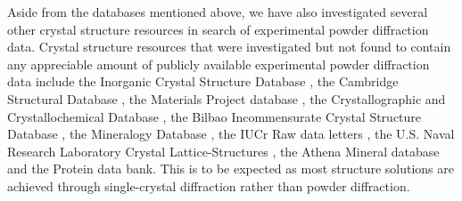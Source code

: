 Aside from the databases mentioned above, we have also investigated several other crystal structure resources in search of experimental powder diffraction data. Crystal structure resources that were investigated but not found to contain any appreciable amount of publicly available experimental powder diffraction data include the Inorganic Crystal Structure Database \cite{ICSDWeb}, the Cambridge Structural Database \cite{CambridgeWeb}, the Materials Project database \cite{MatProjWeb}, the Crystallographic and Crystallochemical Database \cite{CrystallochemicalWeb}, the Bilbao Incommensurate Crystal Structure Database \cite{BilbaoWeb}, the Mineralogy Database \cite{MineralogyWeb}, the IUCr Raw data letters \cite{IUCrWeb}, the U.S. Naval Research Laboratory Crystal Lattice-Structures \cite{NRLWeb}, the Athena Mineral database \cite{AthenaWeb} and the Protein data bank\cite{PDBWeb}. This is to be expected as most structure solutions are achieved through single-crystal diffraction rather than powder diffraction. \\ 